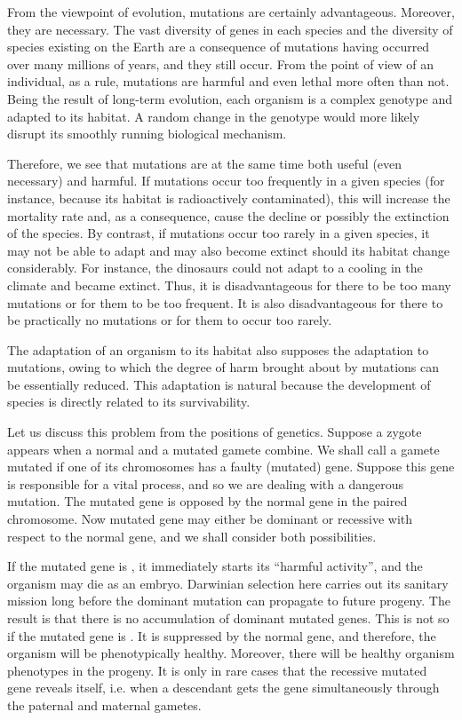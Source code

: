  From the viewpoint of
evolution, mutations are certainly advantageous. Moreover, they are
necessary. The vast diversity of genes in each species and the diversity of
species existing on the Earth are a consequence of mutations having
occurred over many millions of years, and they still occur. From the
point of view of an individual, as a rule, mutations are harmful and even
lethal more often than not. Being the result of long-term evolution, each
organism is a complex genotype and adapted to its habitat. A random
change in the genotype would more likely disrupt its smoothly running
biological mechanism.

Therefore, we see that mutations are at the same time both useful
(even necessary) and harmful. If mutations occur too frequently in
a given species (for instance, because its habitat is radioactively
contaminated), this will increase the mortality rate and, as
a consequence, cause the decline or possibly the extinction of the
species. By contrast, if mutations occur too rarely in a given species, it
may not be able to adapt and may also become extinct should its
habitat change considerably. For instance, the dinosaurs could not
adapt to a cooling in the climate and became extinct. Thus, it is
disadvantageous for there to be too many mutations or for them to be
too frequent. It is also disadvantageous for there to be practically no
mutations or for them to occur too rarely.

 The adaptation of an organism to its
habitat also supposes the adaptation to mutations, owing to which the
degree of harm brought about by mutations can be essentially reduced.
This adaptation is natural because the development of species is directly
related to its survivability.

Let us discuss this problem from the positions of genetics. Suppose
a zygote appears when a normal and a mutated gamete combine. We
shall call a gamete mutated if one of its chromosomes has a faulty
(mutated) gene. Suppose this gene is responsible for a vital process, and
so we are dealing with a dangerous mutation. The mutated gene is
opposed by the normal gene in the paired chromosome. Now mutated
gene may either be dominant or recessive with respect to the normal
gene, and we shall consider both possibilities.

If the mutated gene is , it immediately starts its ``harmful
activity'', and the organism may die as an embryo. Darwinian selection
here carries out its sanitary mission long before the dominant mutation
can propagate to future progeny. The result is that there is no accumulation
of dominant mutated genes. This is not so if the mutated gene
is . It is suppressed by the normal gene, and therefore, the
organism will be phenotypically healthy. Moreover, there will be healthy
organism phenotypes in the progeny. It is only in rare cases that the
recessive mutated gene reveals itself, i.e. when a descendant gets the
gene simultaneously through the paternal and maternal gametes.


